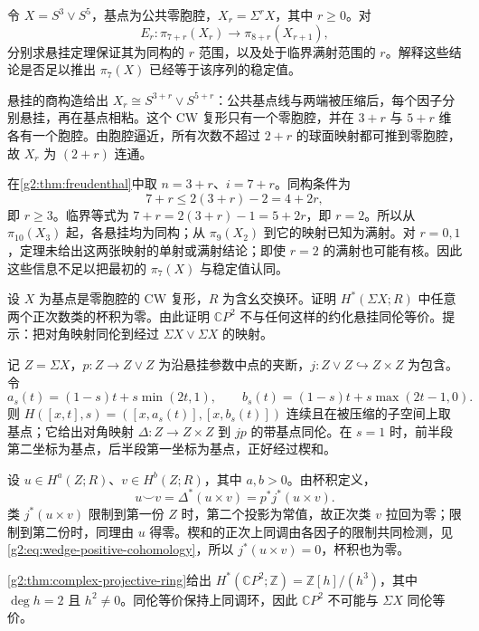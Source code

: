 \begin{exercise}\label{g2:ex:suspension-range-wedge}
	令 \(X=S^3\vee S^5\)，基点为公共零胞腔，\(X_r=\Sigma^rX\)，其中 \(r\ge0\)。对
	\[
		E_r:\pi_{7+r}(X_r)\longrightarrow\pi_{8+r}(X_{r+1}),
	\]
	分别求悬挂定理保证其为同构的 \(r\) 范围，以及处于临界满射范围的 \(r\)。解释这些结论是否足以推出 \(\pi_7(X)\) 已经等于该序列的稳定值。
\end{exercise}
\begin{solution}
	悬挂的商构造给出 \(X_r\cong S^{3+r}\vee S^{5+r}\)：公共基点线与两端被压缩后，每个因子分别悬挂，再在基点相粘。这个 CW 复形只有一个零胞腔，并在 \(3+r\) 与 \(5+r\) 维各有一个胞腔。由胞腔逼近，所有次数不超过 \(2+r\) 的球面映射都可推到零胞腔，故 \(X_r\) 为 \((2+r)\) 连通。

	在\cref{g2:thm:freudenthal}中取 \(n=3+r\)、\(i=7+r\)。同构条件为
	\[
		7+r\le2(3+r)-2=4+2r,
	\]
	即 \(r\ge3\)。临界等式为 \(7+r=2(3+r)-1=5+2r\)，即 \(r=2\)。所以从 \(\pi_{10}(X_3)\) 起，各悬挂均为同构；从 \(\pi_9(X_2)\) 到它的映射已知为满射。对 \(r=0,1\)，定理未给出这两张映射的单射或满射结论；即使 \(r=2\) 的满射也可能有核。因此这些信息不足以把最初的 \(\pi_7(X)\) 与稳定值认同。
\end{solution}

\begin{exercise}\label{g2:ex:suspension-cup-vanishing}
	设 \(X\) 为基点是零胞腔的 CW 复形，\(R\) 为含幺交换环。证明 \(H^*(\Sigma X;R)\) 中任意两个正次数类的杯积为零。由此证明 \(\mathbb CP^2\) 不与任何这样的约化悬挂同伦等价。提示：把对角映射同伦到经过 \(\Sigma X\vee\Sigma X\) 的映射。
\end{exercise}
\begin{solution}
	记 \(Z=\Sigma X\)，\(p:Z\rightarrow Z\vee Z\) 为沿悬挂参数中点的夹断，\(j:Z\vee Z\hookrightarrow Z\times Z\) 为包含。令
	\[
		a_s(t)=(1-s)t+s\min(2t,1),\qquad
		b_s(t)=(1-s)t+s\max(2t-1,0).
	\]
	则 \(H([x,t],s)=([x,a_s(t)],[x,b_s(t)])\) 连续且在被压缩的子空间上取基点；它给出对角映射 \(\Delta:Z\rightarrow Z\times Z\) 到 \(jp\) 的带基点同伦。在 \(s=1\) 时，前半段第二坐标为基点，后半段第一坐标为基点，正好经过楔和。

	设 \(u\in H^a(Z;R)\)、\(v\in H^b(Z;R)\)，其中 \(a,b>0\)。由杯积定义，
	\[
		u\smile v=\Delta^*(u\times v)=p^*j^*(u\times v).
	\]
	类 \(j^*(u\times v)\) 限制到第一份 \(Z\) 时，第二个投影为常值，故正次类 \(v\) 拉回为零；限制到第二份时，同理由 \(u\) 得零。楔和的正次上同调由各因子的限制共同检测，见\eqref{g2:eq:wedge-positive-cohomology}，所以 \(j^*(u\times v)=0\)，杯积也为零。

	\cref{g2:thm:complex-projective-ring}给出 \(H^*(\mathbb CP^2;\mathbb Z)=\mathbb Z[h]/(h^3)\)，其中 \(\deg h=2\) 且 \(h^2\ne0\)。同伦等价保持上同调环，因此 \(\mathbb CP^2\) 不可能与 \(\Sigma X\) 同伦等价。
\end{solution}

